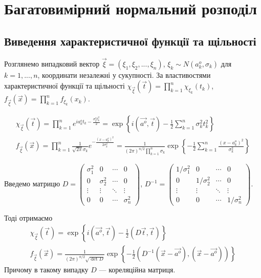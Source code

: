 
\section{Багатовимірний нормальний розподіл}
\subsection{Виведення характеристичної функції та щільності}

Розглянемо випадковий вектор $\vec{\xi} = (\xi_1, \xi_2, ..., \xi_n)$, $\xi_k \sim {N}(a_k^o, \sigma_k)$ для $k=1,...,n$, координати незалежні у сукупності.
За властивостями характеристичної функції та щільності $\chi_{\vec{\xi}}(\vec{t}) = \prod\limits_{k=1}^n \chi_{\xi_k}(t_k)$,
$f_{\vec{\xi}}(\vec{x}) = \prod\limits_{k=1}^n f_{\xi_k}(x_k)$.

\begin{gather*}
    \chi_{\vec{\xi}}(\vec{t}) = \prod\limits_{k=1}^n e^{i a_k^o t_k - \frac{\sigma_k^2 t_k^2}{2}} = \exp\left\{i(\vec{a^o}, \vec{t}) - \frac{1}{2}\sum\limits_{k=1}^n \sigma_k^2 t_k^2\right\}
    \\
    f_{\vec{\xi}}(\vec{x}) = \prod\limits_{k=1}^n \frac{1}{\sqrt{2\pi}\sigma_k} e^{-\frac{(x-a_k^o)^2}{2\sigma_k^2}} = \frac{1}{(2\pi)^{n/2}\prod_{k=1}^n \sigma_k} \exp \left\{ -\frac{1}{2} \sum_{k=1}^n \frac{(x-a_k^o)^2}{\sigma_k^2}\right\}
\end{gather*}

Введемо матрицю $D = \begin{pmatrix}
    \sigma_1^2 & 0 & \cdots & 0 \\
    0 & \sigma_2^2 & \cdots & 0 \\
    \vdots & \vdots & \ddots & \vdots \\
    0 & 0 & \cdots & \sigma_n^2
\end{pmatrix}$, $D^{-1} = \begin{pmatrix}
    1/\sigma_1^2 & 0 & \cdots & 0 \\
    0 & 1/\sigma_2^2 & \cdots & 0 \\
    \vdots & \vdots & \ddots & \vdots \\
    0 & 0 & \cdots & 1/\sigma_n^2
\end{pmatrix}$.

\noindent Тоді отримаємо
\begin{gather}
    \chi_{\vec{\xi}}(\vec{t}) = \exp\left\{i(\vec{a^o}, \vec{t}) - \frac{1}{2}(D\vec{t}, \vec{t})\right\}
    \\
    f_{\vec{\xi}}(\vec{x}) = \frac{1}{(2\pi)^{n/2} \sqrt{{\det{D}}}} \exp \left\{ -\frac{1}{2} \left( D^{-1}(\vec{x} - \vec{a^o}), (\vec{x} - \vec{a^o})\right)\right\}
\end{gather}
Причому в такому випадку $D$ --- кореляційна матриця.

